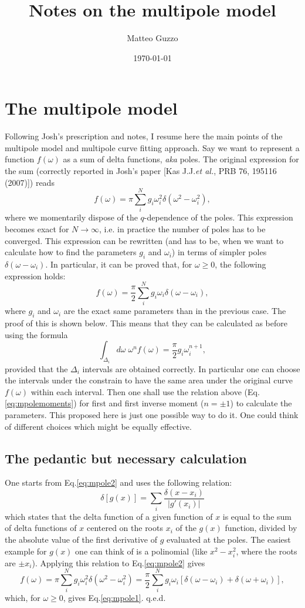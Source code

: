 \documentclass[a4paper,12pt]{article}
\title{Notes on the multipole model}
\author{Matteo Guzzo}
\date{\today}
\def\be{\begin{equation}}
\def\ee{\end{equation}}
\begin{document}
\maketitle

\section{The multipole model}
Following Josh's prescription and notes, I resume here the main points of the 
multipole model and multipole curve fitting approach. 
Say we want to represent a function $ f ( \omega ) $ as a sum of delta functions, 
\emph{aka} poles. 
The original expression for the sum (correctly reported in Josh's paper 
[Kas J.J.\@ \emph{et al.}, PRB 76, 195116 (2007)]) reads
\be
 f(\omega) = \pi \sum_i^{N} g_i \omega_i^2 \delta( \omega^2 - \omega_i^2 ), 
 \label{eq:mpole2}
\ee
where we momentarily dispose of the $q$-dependence of the poles. 
This expression becomes exact for $ N \rightarrow \infty $, 
i.e. in practice the number of poles has to be converged. 
This expression can be rewritten (and has to be, when we want to calculate how to find 
the parameters $ g_i $ and $\omega_i $) in terms of simpler poles 
$ \delta( \omega - \omega_i ) $. 
In particular, it can be proved that, for $ \omega \geq 0 $, the following expression 
holds: 
\be
 f(\omega) = \frac{\pi}{2} \sum_i^{N} g_i \omega_i \delta( \omega - \omega_i ), 
 \label{eq:mpole1}
\ee
where  $ g_i $ and $\omega_i $ are the exact same parameters than in the previous case. 
The proof of this is shown below. 
This means that they can be calculated as before using the formula
\be
 \int_{\Delta_i} d \omega \; \omega^n f( \omega ) = \frac{\pi}{2} g_i \omega_i^{n+1} , 
 \label{eq:mpolemoments}
\ee
provided that the $ \Delta_i $ intervals are obtained correctly. 
In particular one can choose the intervals under the constrain to have the same area 
under the original curve $ f ( \omega ) $ within each interval. 
Then one shall use the relation above (Eq.\@ \eqref{eq:mpolemoments}) 
for first and first inverse moment ($ n = \pm 1 $) to calculate 
the parameters. 
This proposed here is just one possible way to do it. 
One could think of different choices which might be equally effective.

\subsection{The pedantic but necessary calculation} 
One starts from Eq.\@ \eqref{eq:mpole2} and uses the following relation: 
\be
 \delta[ g(x) ] = \sum_i \frac { \delta ( x - x_i ) }{ | g' ( x_i ) | }
\ee
which states that the delta function of a given function of $ x $ is equal to the sum 
of delta functions of $ x $ centered on the roots $ x_i $ of the $ g(x) $ function, 
divided by the absolute value of the first derivative of $ g $ evaluated at 
the poles. 
The easiest example for $ g(x) $ one can think of 
is a polinomial (like $  x^2 - x_i^2 $, where the roots are $ \pm x_i $). 
Applying this relation  to Eq.\@ \eqref{eq:mpole2} gives 
\be
 f(\omega) = \pi \sum_i^{N} g_i \omega_i^2 \delta( \omega^2 - \omega_i^2 ) 
 =  \frac{\pi}{2} \sum_i^{N} g_i \omega_i [ \delta( \omega - \omega_i ) + \delta( \omega + \omega_i ) ] , 
\ee
which, for $ \omega \geq 0 $, gives Eq.\@ \eqref{eq:mpole1}. q.e.d. 
\end{document}
